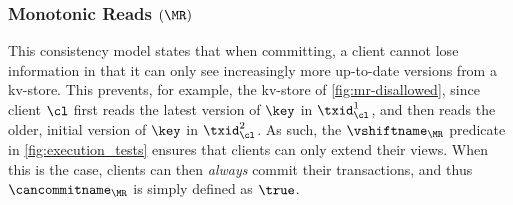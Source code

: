 \subsubsection{Monotonic Reads \((\MR)\)}
This consistency model states that when committing, a client
cannot lose information in that it can only see increasingly more up-to-date versions from a kv-store.
This prevents, for example, the kv-store of \cref{fig:mr-disallowed},
since client \(\cl\) first reads the latest version of \(\key\) in \(\txid_{\cl}^{1}\), 
and then reads the older, initial version of \(\key\) in \(\txid_{\cl}^{2}\).  
As such, the \(\vshiftname_{\MR}\) predicate in \cref{fig:execution_tests} ensures that clients  can only extend their views. 
When this is the case, clients can then \emph{always} commit their transactions, and thus \(\cancommitname_{\MR}\) is simply defined as \(\true\). 
%
%


